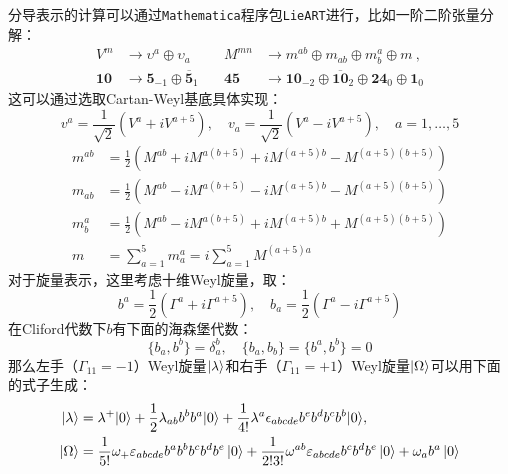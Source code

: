分导表示的计算可以通过\texttt{Mathematica}程序包\texttt{LieART}\cite{FEGER2020107490}进行，比如一阶二阶张量分解：
\begin{equation}
	\begin{aligned}
		V^{m}&\to\upsilon^{a}\oplus\upsilon_{a}\quad&M^{mn}&\to m^{ab}\oplus m_{ab}\oplus m_{b}^{a}\oplus m\mathrm{~,}\\
		\mathbf{10}&\to\mathbf{5}_{-1}\oplus\mathbf{\overline{5}}_{1}\quad&\mathbf{45}&\to\mathbf{10}_{-2}\oplus\mathbf{\overline{10}}_{2}\oplus\mathbf{24}_{0}\oplus\mathbf{1}_{0}
		\end{aligned}
\end{equation}
这可以通过选取Cartan-Weyl基底具体实现：\cite{Nekrasov:2005wg}
\begin{equation}
	v^a=\frac{1}{\sqrt{2}}\left(V^a+iV^{a+5}\right),\quad v_a=\frac{1}{\sqrt{2}}\left(V^a-iV^{a+5}\right),\quad a=1,\ldots,5
\end{equation}
\begin{equation}
	\begin{aligned}
		m^{ab}&=\frac{1}{2}\left(M^{ab}+iM^{a(b+5)}+iM^{(a+5)b}-M^{(a+5)(b+5)}\right)\\
		m_{ab}&=\frac{1}{2}\left(M^{ab}-iM^{a(b+5)}-iM^{(a+5)b}-M^{(a+5)(b+5)}\right)\\
		m_b^a&=\frac{1}{2}\left(M^{ab}-iM^{a(b+5)}+iM^{(a+5)b}+M^{(a+5)(b+5)}\right)\\
		m&=\sum_{a=1}^5m_a^a=i\sum_{a=1}^5M^{(a+5)a}
	\end{aligned}
\end{equation}
对于旋量表示，这里考虑十维Weyl旋量，取：
\begin{equation}
	b^a=\frac{1}{2}\left(\Gamma^a+i\Gamma^{a+5}\right),\quad b_a=\frac{1}{2}\left(\Gamma^a-i\Gamma^{a+5}\right)
\end{equation}
在Cliford代数下$b$有下面的海森堡代数：
\begin{equation}
	\{b_a,b^b\}=\delta_a^b,\quad\{b_a,b_b\}=\{b^a,b^b\}=0
\end{equation}
那么左手（$\Gamma_{11}=-1$）Weyl旋量$\ket{\lambda}$和右手（$\Gamma_{11}=+1$）Weyl旋量$\ket{\Omega}$可以用下面的式子生成：
\begin{equation}
	\begin{aligned}
		\left|\lambda\right\rangle&=\lambda^+|0\rangle+\frac{1}{2}\lambda_{ab}b^bb^a|0\rangle+\frac{1}{4!}\lambda^a\epsilon_{abcde}b^eb^db^cb^b|0\rangle,\\\left|{\Omega}\right\rangle&=\frac{1}{5!}\omega_+\varepsilon_{abcde}b^ab^bb^cb^db^e\ket{0}+\frac{1}{2!3!}\omega^{ab}\varepsilon_{abcde}b^cb^db^e\ket{0}+\omega_ab^a\ket{0}
	\end{aligned}
\end{equation}

